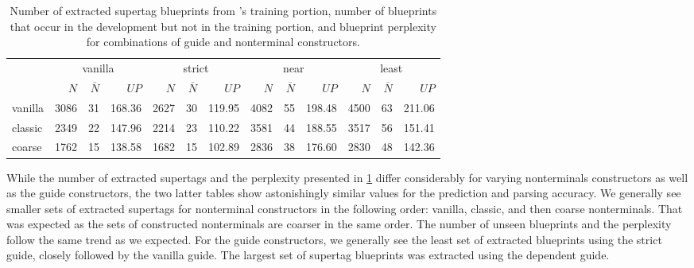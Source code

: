 \documentclass[../../document.tex]{subfiles}
\begin{document}
    \begin{table}
        \caption{\label{tbl:gridsearch:1:1}
            Number of extracted supertag blueprints from \negra{}'s training portion, number of blueprints that occur in the development but not in the training portion, and blueprint perplexity for combinations of guide and nonterminal constructors.
        }
        \centering
        \setlength{\tabcolsep}{5pt}
        \vspace{.2cm}
        \begin{tabular}{l|rrr|rrr|rrr|rrr}
            \toprule
                        & \multicolumn{3}{c|}{vanilla} & \multicolumn{3}{c|}{strict} & \multicolumn{3}{c|}{near} & \multicolumn{3}{c}{least} \\
                        & $N$ & $\overline{N}$ & $\mathit{UP}$ & $N$ & $\overline{N}$ & $\mathit{UP}$ & $N$ & $\overline{N}$ & $\mathit{UP}$ & $N$ & $\overline{N}$ & $\mathit{UP}$ \\ \hline
            vanilla     & 3086 & 31 & 168.36 & 2627 & 30 & 119.95 & 4082 & 55 & 198.48 & 4500 & 63 & 211.06 \\
            classic     & 2349 & 22 & 147.96 & 2214 & 23 & 110.22 & 3581 & 44 & 188.55 & 3517 & 56 & 151.41 \\
            coarse      & 1762 & 15 & 138.58 & 1682 & 15 & 102.89 & 2836 & 38 & 176.60 & 2830 & 48 & 142.36 \\
            \bottomrule
        \end{tabular}
    \end{table}

    While the number of extracted supertags and the perplexity presented in \cref{tbl:gridsearch:1:1} differ considerably for varying nonterminals constructors as well as the guide constructors, the two latter tables show astonishingly similar values for the prediction and parsing accuracy.
    We generally see smaller sets of extracted supertags for nonterminal constructors in the following order: vanilla, classic, and then coarse nonterminals.
    That was expected as the sets of constructed nonterminals are coarser in the same order.
    The number of unseen blueprints and the perplexity follow the same trend as we expected.
    For the guide constructors, we generally see the least set of extracted blueprints using the strict guide,  closely followed by the vanilla guide.
    The largest set of supertag blueprints was extracted using the dependent guide.
\end{document}
